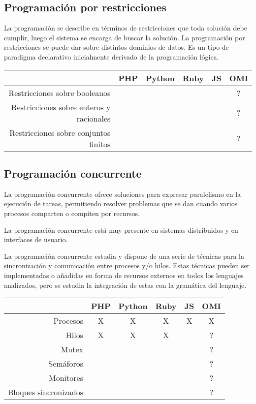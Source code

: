 \subsection{Programación por restricciones}
La programación se describe en términos de restricciones que toda solución debe cumplir, luego el
sistema se encarga de buscar la solución. La programación por restricciones se puede dar sobre distintos
dominios de datos. Es un tipo de paradigma declarativo inicialmente derivado de la programación lógica.

\FloatBarrier
\begin{table}[h]
\begin{center}
 
\begin{tabular}{|r|c|c|c|c|c|} \hline
 & PHP  & Python & Ruby & JS & OMI\\ \hline
Restricciones sobre booleanos& & & & & ? \\ \hline
Restricciones sobre enteros y racionales& & & & & ? \\ \hline
Restricciones sobre conjuntos finitos & & & & & ? \\ \hline
\end{tabular}
\end{center}
\end{table}
\FloatBarrier

\subsection{Programación concurrente}
La programación concurrente ofrece soluciones para expresar paralelismo en la ejecución de 
tareas, permitiendo resolver problemas que se dan cuando varios procesos comparten o compiten
por recursos.

La programación concurrente está muy presente en sistemas distribuidos y en interfaces de
usuario.

La programación concurrente estudia y dispone de una serie de técnicas para la sincronización 
y comunicación entre procesos y/o hilos. Estas técnicas pueden ser implementadas o añadidas en forma de recursos externos en todos los lenguajes analizados, pero se estudia la integración de estas con la gramática del lenguaje.

\FloatBarrier
\begin{table}[h]
\begin{center}
 
\begin{tabular}{|r|c|c|c|c|c|} \hline
 & PHP  & Python & Ruby & JS & OMI\\ \hline
Procesos & X & X & X  & X & X \\ \hline
Hilos & X & X & X &  & ? \\ \hline
Mutex &  &  & &  & ? \\ \hline
Semáforos &  &  & &  & ? \\ \hline
Monitores & & & &  & ? \\ \hline
Bloques sincronizados & & & &  & ? \\ \hline
\end{tabular}
\end{center}
\end{table}
\FloatBarrier



